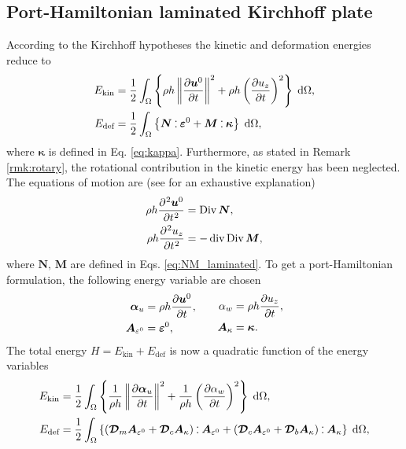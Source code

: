 \subsection{Port-Hamiltonian laminated Kirchhoff plate}
According to the Kirchhoff hypotheses the kinetic and deformation energies reduce to 
\begin{equation*}
\begin{aligned}
E_{\text{kin}} &= \energy{\rho h \norm{\diffp{\bm{u}^0}{t}}^2 + \rho h \left(\diffp{u_z}{t}\right)^2}, \\
E_{\text{def}} &= \energy{\bm{N} \cddot \bm{\varepsilon}^0 + \bm{M} \cddot \bm{\kappa}}, 
\end{aligned}
\end{equation*}
where $\bm{\kappa}$ is defined in Eq. \eqref{eq:kappa}. Furthermore, as stated in Remark \ref{rmk:rotary}, the rotational contribution in the kinetic energy has been neglected. The equations of motion are (see \cite[Chapter~3]{reddy2003mechanics} for an exhaustive explanation)
\begin{equation}\label{eq:sysLamKir}
\begin{aligned}
\rho h \diffp[2]{\bm{u}^0}{t} &= \Div \bm{N}, \\
\rho h \diffp[2]{{u}_z}{t} &= -\div\Div \bm{M}, 
\end{aligned}	
\end{equation}
where $\bm{N}, \, \bm{M}$ are defined in Eqs. \eqref{eq:NM_laminated}. 
To get a port-Hamiltonian formulation, the following energy variable are chosen
\begin{equation}
\begin{aligned}
\bm{\alpha}_u &= \rho h \diffp{\bm{u}^0}{t}, \\
\bm{A}_{\varepsilon^0} &= \bm{\varepsilon}^0,
\end{aligned} \qquad
\begin{aligned}
{\alpha}_w &= \rho h \diffp{{u}_z}{t}, \\
\bm{A}_{\kappa} &= \bm{\kappa}.
\end{aligned} 
\end{equation} 
The total energy $H=E_{\text{kin}} + E_{\text{def}}$ is now a quadratic function of the energy variables
\begin{equation*}
\begin{aligned}
E_{\text{kin}} &= \energy{\frac{1}{\rho h} \norm{\diffp{\bm{\alpha}_u}{t}}^2 + \frac{1}{\rho h} \left(\diffp{\alpha_w}{t}\right)^2}, \\
E_{\text{def}} &= \energy{(\bm{\mathcal{D}}_m \bm{A}_{\varepsilon^0} + \bm{\mathcal{D}}_c \bm{A}_{\kappa}) \cddot \bm{A}_{\varepsilon^0} + (\bm{\mathcal{D}}_c \bm{A}_{\varepsilon^0} + \bm{\mathcal{D}}_b \bm{A}_{\kappa}) \cddot \bm{A}_{\kappa}}, 
\end{aligned}
\end{equation*}
